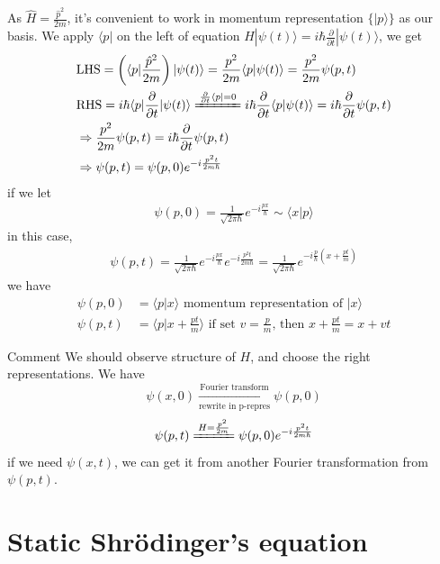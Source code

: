 \documentclass[UTF8,12pt]{article} %
\begin{document}
As $\hat{H} = \frac{\hat{p}^{2}}{2m}$, it's convenient to work in momentum representation $\{|p\rangle\}$ as our basis. We apply $\langle p|$ on the left of equation $H|\psi(t)\rangle = i\hbar\frac{\partial}{\partial t}|\psi(t)\rangle$, we get
\begin{align}
&\text{LHS} = \left(\langle p|\frac{\hat{p}^{2}}{2m}\right)|\psi(t)\rangle = \frac{p^{2}}{2m} \langle p|\psi(t)\rangle = \frac{p^{2}}{2m} \psi(p,t) \\
&\text{RHS} = i\hbar\langle p|\frac{\partial}{\partial t}|\psi(t)\rangle \xlongequal{\frac{\partial}{\partial t}\langle p| = 0} i\hbar\frac{\partial}{\partial t}\langle p|\psi(t)\rangle = i\hbar\frac{\partial}{\partial t}\psi(p,t) \\
&\Rightarrow \frac{p^{2}}{2m}\psi(p,t) = i\hbar\frac{\partial}{\partial t}\psi(p,t) \\
&\Rightarrow \psi(p,t) = \psi(p,0) e^{-i\frac{p^{2}t}{2m\hbar}}
\end{align}
if we let
\begin{align}
\psi(p,0) = \frac{1}{\sqrt{2\pi\hbar}} e^{-i\frac{px}{\hbar}} \sim \langle x|p\rangle
\end{align}
in this case, 
\begin{align}
\boxed{\psi(p,t) = \frac{1}{\sqrt{2\pi\hbar}} e^{-i\frac{px}{\hbar}} e^{-i\frac{p^{2}t}{2m\hbar}} = \frac{1}{\sqrt{2\pi\hbar}} e^{-i\frac{p}{\hbar}\left(x + \frac{pt}{m}\right)}}
\end{align}
we have
\begin{align}
\psi(p,0) &= \langle p|x\rangle \text{ momentum representation of } |x\rangle \\
\psi(p,t) &= \langle p|x + \frac{pt}{m}\rangle \text{ if set } v=\frac{p}{m} \text{, then } x+\frac{pt}{m} = x+vt
\end{align}

\begin{myboxes}{Comment}{}
We should observe structure of $H$, and choose the right representations. We have
$$\psi(x,0) \xrightarrow[\text{rewrite in p-repres}]{\text{Fourier transform}} \psi(p,0)$$
$$\psi(p,t) \xlongequal{H = \frac{p^{2}}{2m}} \psi(p,0) e^{-i\frac{p^{2}t}{2m\hbar}}$$
if we need $\psi(x,t)$, we can get it from another Fourier transformation from $\psi(p,t)$.
\end{myboxes}

\section{Static Shr\"{o}dinger's equation}
\end{document}
